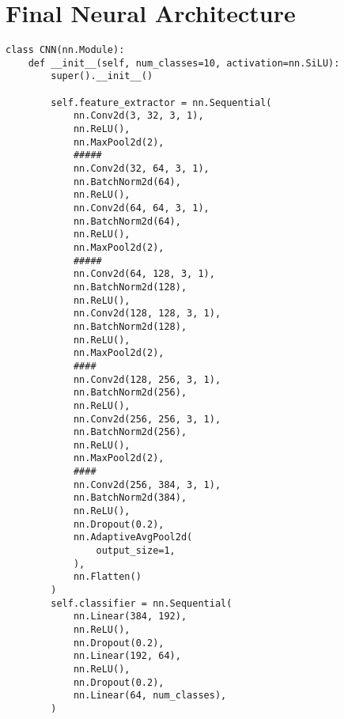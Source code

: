 \documentclass{article} %
\begin{document}
\section{Final Neural Architecture}
\label{app:finalArchitecture}
\begin{lstlisting}
class CNN(nn.Module):
    def __init__(self, num_classes=10, activation=nn.SiLU):
        super().__init__()
        
        self.feature_extractor = nn.Sequential(
            nn.Conv2d(3, 32, 3, 1),
            nn.ReLU(),          
            nn.MaxPool2d(2),
            #####
            nn.Conv2d(32, 64, 3, 1),
            nn.BatchNorm2d(64),
            nn.ReLU(),           
            nn.Conv2d(64, 64, 3, 1),
            nn.BatchNorm2d(64),
            nn.ReLU(),          
            nn.MaxPool2d(2),            
            #####
            nn.Conv2d(64, 128, 3, 1),
            nn.BatchNorm2d(128),
            nn.ReLU(),           
            nn.Conv2d(128, 128, 3, 1),
            nn.BatchNorm2d(128),
            nn.ReLU(),          
            nn.MaxPool2d(2),
            ####
            nn.Conv2d(128, 256, 3, 1),
            nn.BatchNorm2d(256),
            nn.ReLU(),           
            nn.Conv2d(256, 256, 3, 1),
            nn.BatchNorm2d(256),
            nn.ReLU(),           
            nn.MaxPool2d(2),
            ####
            nn.Conv2d(256, 384, 3, 1),
            nn.BatchNorm2d(384),
            nn.ReLU(),
            nn.Dropout(0.2),
            nn.AdaptiveAvgPool2d(
                output_size=1,
            ),
            nn.Flatten()
        )
        self.classifier = nn.Sequential(
            nn.Linear(384, 192),            
            nn.ReLU(),
            nn.Dropout(0.2),
            nn.Linear(192, 64),            
            nn.ReLU(),
            nn.Dropout(0.2),
            nn.Linear(64, num_classes),
        )
\end{lstlisting}
\end{document}
